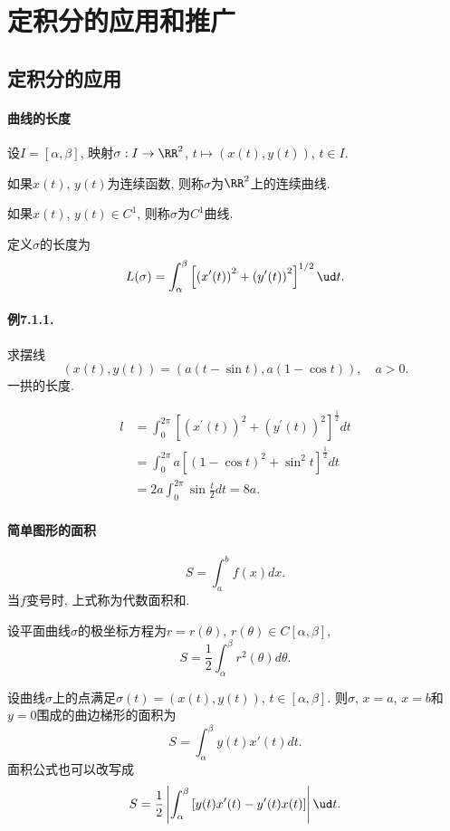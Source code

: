 
\section{定积分的应用和推广}

\subsection{定积分的应用}

\paragraph{曲线的长度}

设$I=[\alpha,\beta]$, 映射$\sigma:I\to\RR^{2}$, $t\mapsto\left(x(t),y(t)\right)$,
$t\in I$. 

如果$x(t)$, $y(t)$为连续函数, 则称$\sigma$为$\RR^{2}$上的连续曲线. 

如果$x(t)$, $y(t)\in C^{1}$, 则称$\sigma$为$C^{1}$曲线.

定义$\sigma$的长度为
\[
L(\sigma)=\int_{\alpha}^{\beta}\left[\left(x'(t)\right)^{2}+\left(y'(t)\right)^{2}\right]^{1/2}\ud t.
\]


\paragraph{例7.1.1. }

求摆线
\[
\left(x(t),y(t)\right)=\left(a(t-\sin t),a(1-\cos t)\right),\quad a>0.
\]
一拱的长度.

\[
\begin{aligned}l & =\int_{0}^{2\pi}\left[\left(x^{\prime}(t)\right)^{2}+\left(y^{\prime}(t)\right)^{2}\right]^{\frac{1}{2}}dt\\
 & =\int_{0}^{2\pi}a\left[(1-\cos t)^{2}+\sin^{2}t\right]^{\frac{1}{2}}dt\\
 & =2a\int_{0}^{2\pi}\sin\frac{t}{2}dt=8a.
\end{aligned}
\]


\paragraph{简单图形的面积}

\[
S=\int_{a}^{b}f(x)dx.
\]
当$f$变号时, 上式称为代数面积和.

设平面曲线$\sigma$的极坐标方程为$r=r(\theta)$, $r(\theta)\in C[\alpha,\beta]$,
\[
S=\frac{1}{2}\int_{\alpha}^{\beta}r^{2}(\theta)d\theta.
\]

设曲线$\sigma$上的点满足$\sigma(t)=\left(x(t),y(t)\right)$, $t\in[\alpha,\beta]$.
则$\sigma$, $x=a$, $x=b$和$y=0$围成的曲边梯形的面积为
\[
S=\int_{\alpha}^{\beta}y(t)x'(t)dt.
\]
面积公式也可以改写成
\[
S=\frac{1}{2}\left|\int_{\alpha}^{\beta}\left[y(t)x'(t)-y'(t)x(t)\right]\right|\ud t.
\]


